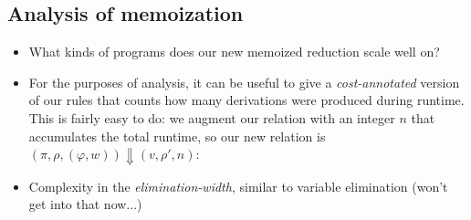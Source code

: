 \documentclass{tufte-handout}
\begin{document}
\subsection{Analysis of memoization}
\begin{itemize}
  \item What kinds of \prop{} programs does our new memoized reduction scale
  well on?
  \item For the purposes of analysis, it can be useful to give a
  \emph{cost-annotated} version of our rules that counts how many derivations
  were produced during runtime. This is fairly easy to do: we augment our relation 
  with an integer $n$ that accumulates the total runtime, so our new 
  relation is $(\pi, \rho, (\varphi, w)) \Downarrow (v, \rho', n)$:


  \item Complexity in the \emph{elimination-width}, similar to variable
  elimination (won't get into that now...)

\end{itemize}
\end{document}
